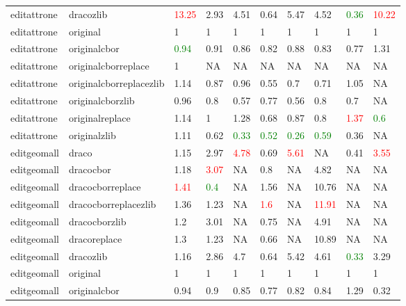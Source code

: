 \begin{landscape}
\begin{longtable}{llllllllll}
editattrone & dracozlib & \textcolor{red}{13.25} & 2.93 & 4.51 & 0.64 & 5.47 & 4.52 & \textcolor{green}{0.36} & \textcolor{red}{10.22}\\
editattrone & original & 1 & 1 & 1 & 1 & 1 & 1 & 1 & 1\\
editattrone & originalcbor & \textcolor{green}{0.94} & 0.91 & 0.86 & 0.82 & 0.88 & 0.83 & 0.77 & 1.31\\
editattrone & originalcborreplace & 1 & NA & NA & NA & NA & NA & NA & NA\\
\rowcolor{lightgray}  editattrone & originalcborreplacezlib & 1.14 & 0.87 & 0.96 & 0.55 & 0.7 & 0.71 & 1.05 & NA\\
\rowcolor{lightgray}  editattrone & originalcborzlib & 0.96 & 0.8 & 0.57 & 0.77 & 0.56 & 0.8 & 0.7 & NA\\
\rowcolor{lightgray}  editattrone & originalreplace & 1.14 & 1 & 1.28 & 0.68 & 0.87 & 0.8 & \textcolor{red}{1.37} & \textcolor{green}{0.6}\\
\rowcolor{lightgray}  editattrone & originalzlib & 1.11 & 0.62 & \textcolor{green}{0.33} & \textcolor{green}{0.52} & \textcolor{green}{0.26} & \textcolor{green}{0.59} & 0.36 & NA\\
\rowcolor{lightgray}  editgeomall & draco & 1.15 & 2.97 & \textcolor{red}{4.78} & 0.69 & \textcolor{red}{5.61} & NA & 0.41 & \textcolor{red}{3.55}\\
\rowcolor{lightgray}  editgeomall & dracocbor & 1.18 & \textcolor{red}{3.07} & NA & 0.8 & NA & 4.82 & NA & NA\\
\rowcolor{lightgray}  editgeomall & dracocborreplace & \textcolor{red}{1.41} & \textcolor{green}{0.4} & NA & 1.56 & NA & 10.76 & NA & NA\\
\rowcolor{lightgray}  editgeomall & dracocborreplacezlib & 1.36 & 1.23 & NA & \textcolor{red}{1.6} & NA & \textcolor{red}{11.91} & NA & NA\\
\rowcolor{lightgray}  editgeomall & dracocborzlib & 1.2 & 3.01 & NA & 0.75 & NA & 4.91 & NA & NA\\
\rowcolor{lightgray}  editgeomall & dracoreplace & 1.3 & 1.23 & NA & 0.66 & NA & 10.89 & NA & NA\\
\rowcolor{lightgray}  editgeomall & dracozlib & 1.16 & 2.86 & 4.7 & 0.64 & 5.42 & 4.61 & \textcolor{green}{0.33} & 3.29\\
\rowcolor{lightgray}  editgeomall & original & 1 & 1 & 1 & 1 & 1 & 1 & 1 & 1\\
\rowcolor{lightgray}  editgeomall & originalcbor & 0.94 & 0.9 & 0.85 & 0.77 & 0.82 & 0.84 & 1.29 & 0.32\\

\end{longtable}
\end{landscape}
